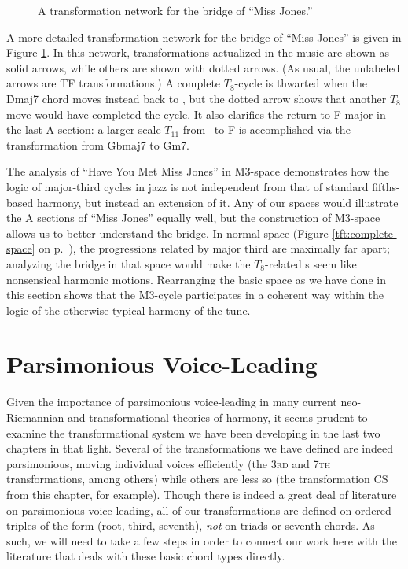 \begin{figure}[tbp]
  \caption{A transformation network for the bridge of ``Miss Jones.''}
\label{maj3:miss-jones-bridge}
\end{figure}

A more detailed transformation network for the bridge of ``Miss Jones'' is
given in Figure \ref{maj3:miss-jones-bridge}. In this network,
transformations actualized in the music are shown as solid arrows, while
others are shown with dotted arrows. (As usual, the unlabeled arrows are TF
transformations.) A complete $T_8$-cycle is thwarted when the \h{Dmaj7} chord
moves instead back to \Gflat, but the dotted arrow shows that another $T_8$ move would
have completed the cycle. It also clarifies the return to F major in the last
A section: a larger-scale $T_{11}$ from \Gflat\ to F is accomplished via the
\slideS transformation from \h{Gbmaj7} to \h{Gm7}.

The analysis of ``Have You Met Miss Jones'' in M3-space demonstrates how the
logic of major-third cycles in jazz is not independent from that of standard
fifths-based harmony, but instead an extension of it. Any of our spaces would
illustrate the A sections of ``Miss Jones'' equally well, but the construction
of M3-space allows us to better understand the bridge. In normal \tf space
(Figure \ref{tft:complete-space} on p.~\pageref{tft:complete-space}), the \tfo
progressions related by major third are maximally far apart; analyzing the
bridge in that space would make the $T_8$-related \tfo{}s seem like
nonsensical harmonic motions. Rearranging the basic space as we have done in
this section shows that the M3-cycle participates in a coherent way within the
logic of the otherwise typical harmony of the tune.

\section{Parsimonious Voice-Leading}
\label{sec:parsimony}

Given the importance of parsimonious voice-leading in many current
neo-Riemannian and transformational theories of harmony, it seems prudent to
examine the transformational system we have been developing in the last two
chapters in that light. Several of the transformations we have defined are
indeed parsimonious, moving individual voices efficiently (the \textsc{3rd}
and \textsc{7th} transformations, among others) while others are less so (the
transformation CS from this chapter, for example). Though there is indeed a
great deal of literature on parsimonious voice-leading, all of our
transformations are defined on ordered triples of the form (root, third,
seventh), \emph{not} on triads or seventh chords. As such, we will need to
take a few steps in order to connect our work here with the literature that
deals with these basic chord types directly.

